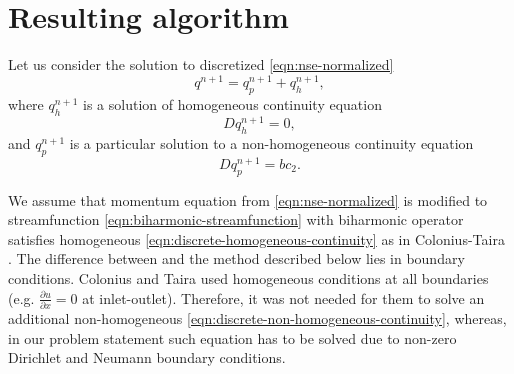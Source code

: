 \documentclass{article}
\numberwithin{equation}{section}
\begin{document}
\pagebreak
\section{Resulting algorithm}\label{sec:algorithm}

Let us consider the solution to discretized \cref{eqn:nse-normalized}
\begin{equation*}
	q^{n+1}=q^{n+1}_p+q^{n+1}_h,
\end{equation*}
where $q^{n+1}_h$ is a solution of homogeneous continuity equation 
\begin{equation}\label{eqn:discrete-homogeneous-continuity}
	Dq^{n+1}_h=0,
\end{equation}
and $q^{n+1}_p$ is a particular solution to a non-homogeneous continuity equation
\begin{equation}\label{eqn:discrete-non-homogeneous-continuity}
	Dq^{n+1}_p=bc_2.
\end{equation}


We assume that momentum equation from \cref{eqn:nse-normalized} is modified to streamfunction \cref{eqn:biharmonic-streamfunction} with biharmonic operator satisfies homogeneous \cref{eqn:discrete-homogeneous-continuity} as in Colonius-Taira \cite{Colonius:2008}. 
The difference between \cite{Colonius:2008} and the method described below lies in boundary conditions. Colonius and Taira used homogeneous conditions at all boundaries (e.g. $\frac{\partial u}{\partial x}=0$ at inlet-outlet). 
Therefore, it was not needed for them to solve an additional non-homogeneous \cref{eqn:discrete-non-homogeneous-continuity}, whereas, in our problem statement such equation has to be solved due to non-zero Dirichlet and Neumann boundary conditions.
\end{document}
